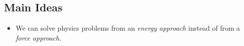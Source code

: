 \documentclass[]{article}
\begin{document}
\newpage
\begin{TeacherMargin}
	
\end{TeacherMargin}
\begin{PresentSpace}
\section*{Main Ideas}
\begin{itemize}
	\item We can solve physics problems from an \textit{energy approach} instead of from a \textit{force approach}.
\end{itemize}
\end{PresentSpace}
\end{document}
